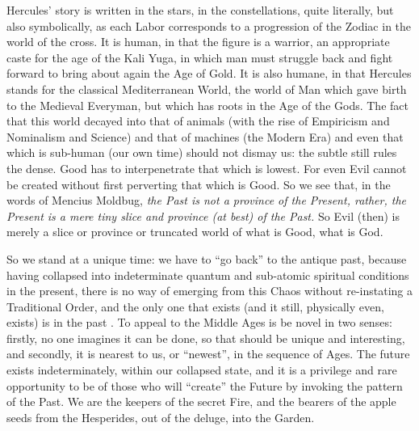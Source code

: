 Hercules' story is written in the stars, in the constellations, quite literally, but also symbolically, as each Labor corresponds to a progression of the Zodiac in the world of the cross. It is human, in that the figure is a warrior, an appropriate caste for the age of the Kali Yuga, in which man must struggle back and fight forward to bring about again the Age of Gold. It is also humane, in that Hercules stands for the classical Mediterranean World, the world of Man which gave birth to the Medieval Everyman, but which has roots in the Age of the Gods. The fact that this world decayed into that of animals (with the rise of Empiricism and Nominalism and Science) and that of machines (the Modern Era) and even that which is sub-human (our own time) should not dismay us: the subtle still rules the dense. Good has to interpenetrate that which is lowest. For even Evil cannot be created without first perverting that which is Good. So we see that, in the words of Mencius Moldbug, \emph{the Past is not a province of the Present, rather, the Present is a mere tiny slice and province (at best) of the Past.} So Evil (then) is merely a slice or province or truncated world of what is Good, what is God.

So we stand at a unique time: we have to ``go back'' to the antique past, because having collapsed into indeterminate quantum and sub-atomic spiritual conditions in the present, there is no way of emerging from this Chaos without re-instating a Traditional Order, and the only one that exists (and it still, physically even, exists) is in the past . To appeal to the Middle Ages is be novel in two senses: firstly, no one imagines it can be done, so that should be unique and interesting, and secondly, it is nearest to us, or ``newest'', in the sequence of Ages. The future exists indeterminately, within our collapsed state, and it is a privilege and rare opportunity to be of those who will ``create'' the Future by invoking the pattern of the Past. We are the keepers of the secret Fire, and the bearers of the apple seeds from the Hesperides, out of the deluge, into the Garden.

